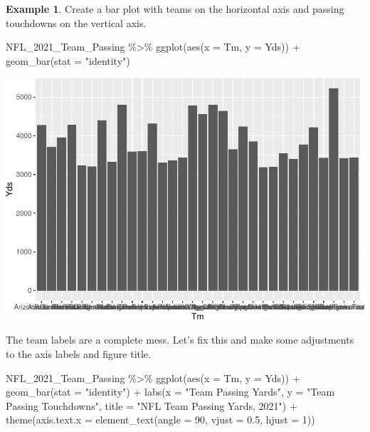 \documentclass[
  11pt,
]{book}
\newenvironment{Shaded}{\begin{snugshade}}{\end{snugshade}}
\newcommand{\AttributeTok}[1]{\textcolor[rgb]{0.77,0.63,0.00}{#1}}
\newcommand{\DecValTok}[1]{\textcolor[rgb]{0.00,0.00,0.81}{#1}}
\newcommand{\FloatTok}[1]{\textcolor[rgb]{0.00,0.00,0.81}{#1}}
\newcommand{\FunctionTok}[1]{\textcolor[rgb]{0.00,0.00,0.00}{#1}}
\newcommand{\NormalTok}[1]{#1}
\newcommand{\SpecialCharTok}[1]{\textcolor[rgb]{0.00,0.00,0.00}{#1}}
\newcommand{\StringTok}[1]{\textcolor[rgb]{0.31,0.60,0.02}{#1}}
\theoremstyle{definition}
\theoremstyle{definition}
\newtheorem{example}{Example}[chapter]
\theoremstyle{definition}
\theoremstyle{definition}
\theoremstyle{remark}
\begin{document}
\begin{example}
Create a bar plot with teams on the horizontal axis and passing touchdowns on the vertical axis.

\begin{Shaded}
\begin{Highlighting}[]
\NormalTok{NFL\_2021\_Team\_Passing }\SpecialCharTok{\%\textgreater{}\%}
    \FunctionTok{ggplot}\NormalTok{(}\FunctionTok{aes}\NormalTok{(}\AttributeTok{x =}\NormalTok{ Tm, }\AttributeTok{y =}\NormalTok{ Yds)) }\SpecialCharTok{+} \FunctionTok{geom\_bar}\NormalTok{(}\AttributeTok{stat =} \StringTok{"identity"}\NormalTok{)}
\end{Highlighting}
\end{Shaded}

\includegraphics{series_files/figure-latex/bar-1.pdf}

The team labels are a complete mess. Let's fix this and make some adjustments to the axis labels and figure title.

\begin{Shaded}
\begin{Highlighting}[]
\NormalTok{NFL\_2021\_Team\_Passing }\SpecialCharTok{\%\textgreater{}\%}
    \FunctionTok{ggplot}\NormalTok{(}\FunctionTok{aes}\NormalTok{(}\AttributeTok{x =}\NormalTok{ Tm, }\AttributeTok{y =}\NormalTok{ Yds)) }\SpecialCharTok{+} \FunctionTok{geom\_bar}\NormalTok{(}\AttributeTok{stat =} \StringTok{"identity"}\NormalTok{) }\SpecialCharTok{+} \FunctionTok{labs}\NormalTok{(}\AttributeTok{x =} \StringTok{"Team Passing Yards"}\NormalTok{,}
    \AttributeTok{y =} \StringTok{"Team Passing Touchdowns"}\NormalTok{, }\AttributeTok{title =} \StringTok{"NFL Team Passing Yards, 2021"}\NormalTok{) }\SpecialCharTok{+} \FunctionTok{theme}\NormalTok{(}\AttributeTok{axis.text.x =} \FunctionTok{element\_text}\NormalTok{(}\AttributeTok{angle =} \DecValTok{90}\NormalTok{,}
    \AttributeTok{vjust =} \FloatTok{0.5}\NormalTok{, }\AttributeTok{hjust =} \DecValTok{1}\NormalTok{))}
\end{Highlighting}
\end{Shaded}


\end{example}
\end{document}
